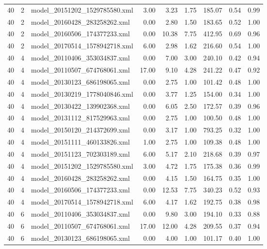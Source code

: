 \begin{table}[ht]
\begin{tabular}{rrlrrrrrr}
   40 &   2 & model\_20151202\_1529785580.xml & 3.00 & 3.23 & 1.75 & 185.07 & 0.54 & 0.99 \\ 
   40 &   2 & model\_20160428\_283258262.xml & 0.00 & 2.80 & 1.50 & 183.65 & 0.52 & 1.00 \\ 
   40 &   2 & model\_20160506\_174377233.xml & 0.00 & 10.38 & 7.75 & 412.95 & 0.69 & 0.96 \\ 
   40 &   2 & model\_20170514\_1578942718.xml & 6.00 & 2.98 & 1.62 & 216.60 & 0.54 & 1.00 \\ 
   40 &   4 & model\_20110406\_353034837.xml & 0.00 & 7.00 & 3.00 & 240.10 & 0.42 & 0.94 \\ 
   40 &   4 & model\_20110507\_674768061.xml & 17.00 & 9.10 & 4.28 & 241.22 & 0.47 & 0.92 \\ 
   40 &   4 & model\_20130123\_686198065.xml & 0.00 & 2.75 & 1.00 & 101.42 & 0.48 & 1.00 \\ 
   40 &   4 & model\_20130219\_1778040846.xml & 0.00 & 3.77 & 1.25 & 154.00 & 0.34 & 1.00 \\ 
   40 &   4 & model\_20130422\_139902368.xml & 0.00 & 6.05 & 2.50 & 172.57 & 0.39 & 0.96 \\ 
   40 &   4 & model\_20131112\_817529963.xml & 0.00 & 2.75 & 1.00 & 100.50 & 0.48 & 1.00 \\ 
   40 &   4 & model\_20150120\_214372699.xml & 0.00 & 3.17 & 1.00 & 793.25 & 0.32 & 1.00 \\ 
   40 &   4 & model\_20151111\_460133826.xml & 1.00 & 2.75 & 1.00 & 109.38 & 0.48 & 1.00 \\ 
   40 &   4 & model\_20151123\_702303189.xml & 6.00 & 5.17 & 2.10 & 218.68 & 0.39 & 0.97 \\ 
   40 &   4 & model\_20151202\_1529785580.xml & 3.00 & 4.72 & 1.75 & 175.38 & 0.36 & 0.99 \\ 
   40 &   4 & model\_20160428\_283258262.xml & 0.00 & 4.15 & 1.50 & 164.75 & 0.35 & 1.00 \\ 
   40 &   4 & model\_20160506\_174377233.xml & 0.00 & 12.53 & 7.75 & 340.23 & 0.52 & 0.93 \\ 
   40 &   4 & model\_20170514\_1578942718.xml & 6.00 & 4.17 & 1.62 & 192.75 & 0.38 & 0.98 \\ 
   40 &   6 & model\_20110406\_353034837.xml & 0.00 & 9.80 & 3.00 & 194.10 & 0.33 & 0.88 \\ 
   40 &   6 & model\_20110507\_674768061.xml & 17.00 & 12.00 & 4.28 & 209.55 & 0.37 & 0.94 \\ 
   40 &   6 & model\_20130123\_686198065.xml & 0.00 & 4.00 & 1.00 & 101.17 & 0.40 & 1.00 \\ 

\end{tabular}
\end{table}
